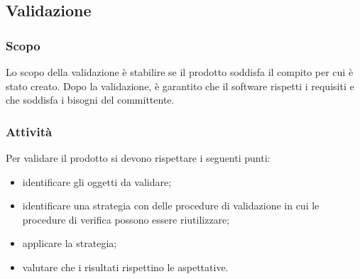 \subsection{Validazione}
	\subsubsection{Scopo}
	Lo scopo della validazione è stabilire se il prodotto soddisfa il compito per cui è stato creato. Dopo la validazione, è garantito che il software rispetti i requisiti e che soddisfa i bisogni del committente.

	\subsubsection{Attività}
	Per validare il prodotto si devono rispettare i seguenti punti:
	\begin{itemize}
		\item identificare gli oggetti da validare;
		\item identificare una strategia con delle procedure di validazione in cui le procedure di verifica possono essere riutilizzare;
		\item applicare la strategia;
		\item valutare che i risultati rispettino le aspettative.
	\end{itemize}
